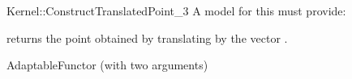 \begin{ccRefFunctionObjectConcept}{Kernel::ConstructTranslatedPoint_3}
A model for this must provide:


       {returns the point obtained by translating  by the vector 
        .}

\ccRefines
AdaptableFunctor (with two arguments)

\ccSeeAlso
{} \\

\end{ccRefFunctionObjectConcept}
